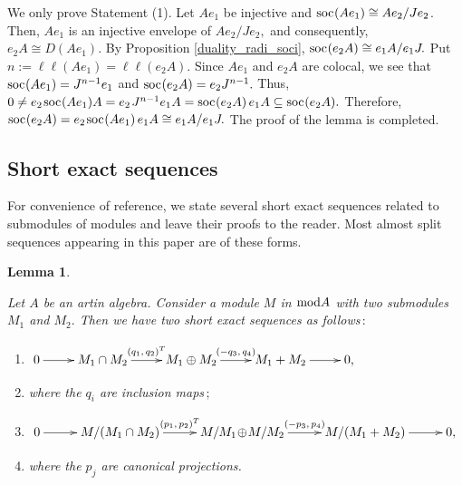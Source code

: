 \documentclass[10pt]{amsart}
\newtheorem{Lemma}[Theo]{Lemma}
\theoremstyle{definition}
\newcommand{\mmod}{{\rm mod}}
\newcommand{\soc}{{\rm soc}\hspace{.5pt}}
\newcommand{\ntop}{{\rm top}\hspace{.5pt}}
\begin{document}
\vspace{-1.5pt}

 We only prove Statement (1). Let $Ae_1$ be injective and $\soc(Ae_1)\cong Ae_2/Je_2$. Then, $Ae_1$ is an injective envelope of $Ae_2/Je_2,$ and consequently, $e_2A \cong D(Ae_1).$ By Proposition \ref{duality_radi_soci}, $\soc(e_2A) 
\cong e_1A/e_1J.$ Put $n:=\ell\ell(Ae_1)=\ell\ell(e_2A).$ Since $Ae_1$ and $e_2A$ are colocal, we see that $\soc(Ae_1)=J^{n-1}e_1$ and $\soc(e_2A)=e_2J^{n-1}.$ Thus, $0\ne e_2 \hspace{1pt}\soc(Ae_1) A = e_2 \hspace{1pt} J^{n-1}e_1 A = \soc(e_2A) \,e_1A \subseteq \soc(e_2A).$ Therefore, $\soc(e_2A)=e_2 \hspace{1pt}\soc(Ae_1) \, e_1 A\cong e_1A/e_1J.$ The proof of the lemma is completed. 

\vspace{-1pt}

\subsection{\sc Short exact sequences} For convenience of reference, we state several short exact sequences related to submodules of modules and leave their proofs to the reader. Most almost split sequences appearing in this paper are of these forms. 

\begin{Lemma}\label{ses_sum_itsec}

Let $A$ be an artin algebra. Consider a module $M$ in $\mmod A$ with two submodules $M_1$ and $M_2.$ Then we have two short exact sequences as follows$\,:$

\begin{enumerate}[$(1)$]

\vspace{-2.5pt}
    
\item $\xymatrix{0\ar[r]& M_1\cap M_2 \ar[r]^-{(q_1, \, q_2)^T}  & M_1 \oplus M_2 \ar[r]^-{(-q_3, \, q_4)} & M_1+M_2 \ar[r] & 0,}$

\vspace{1.5pt}

\item[] \hspace{2pt} where the $q_i$ are inclusion maps$\,;$ 

\vspace{-1pt}

\item $\xymatrixcolsep{26pt} \xymatrix{0\ar[r]& M/(M_1\cap M_2)\ar[r]^-{(p_1, \, p_2)^T}  & M/M_1 \!\oplus\! M/M_2 \ar[r]^-{(-p_3, \, p_4)} & M/(M_1+M_2) \ar[r] & 0,}$ 

\item[] where the $p_j$ are canonical projections. 

\end{enumerate}\end{Lemma}
\end{document}
